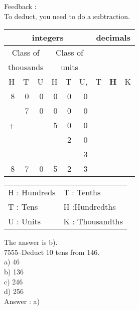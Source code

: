 \documentclass[letterpaper, 12pt]{article}
\begin{document}
Feedback :\\
To deduct, you need to do a subtraction.
\begin{center}
\begin{tabular}{|rrr|rrr|rrr|}
\hline
\multicolumn{6}{|c|}{integers} &\multicolumn{3}{|c|}{decimals} \\
\hline
\multicolumn{3}{|c|}{Class of} &\multicolumn{3}{|c|}{Class of} &  \multicolumn{3}{c|}{} \\
\multicolumn{3}{|c|}{thousands} &\multicolumn{3}{|c|}{units} &  \multicolumn{3}{c|}{} \\
\hline
H & T & U &H & T & U, & T\up{th} & \textbf{H\up{th}} & K\up{th} \\
\hline
\hline
8 & 0 & 0 & 0 & 0 & 0 &  & &\\
 & 7 & 0 & 0 & 0 & 0 &  & &\\
+ &  &  & 5 & 0 & 0 &  & &\\
 &  &  &  & 2 & 0 &  & &\\
 &  &  &  &  & 3 &  & &\\
\hline
\hline
 8 & 7 & 0 & 5 & 2 & 3 &  & &
\\
\hline
\end{tabular}
\end{center}

\scriptsize
\begin{center}
\begin{tabular}{ll}
H : Hundreds & T\up{th} : Tenths\\
T : Tens & H\up{th} :Hundredths\\
U : Units & K\up{e} : Thousandths\\
\end{tabular}
\end{center}

\normalsize
The answer is b).\\



7555--Deduct 10 tens from 146.\\

a) 46\\
b) 136\\
c) 246\\
d) 256\\

Answer : a)\\
\end{document}

